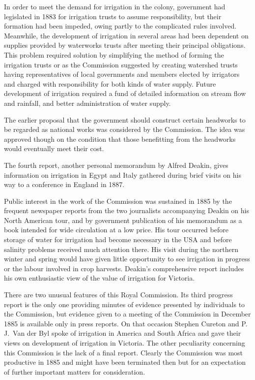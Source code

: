 In order to meet the demand for irrigation in the colony, government
had legislated in 1883 for irrigation trusts to assume responsibility,
but their formation had been impeded, owing partly to the complicated
rules involved.  Meanwhile, the development of irrigation in several
areas had been dependent on supplies provided by waterworks trusts
after meeting their principal obligations.  This problem required
solution by simplifying the method of forming the irrigation trusts
 or as the Commission suggested by creating
watershed trusts  having representatives of
local governments and members elected by irrigators and charged with
responsibility for both kinds of water supply.  Future development of
irrigation required a fund of detailed information on stream flow and
rainfall, and better administration of water supply.

The earlier proposal that the government should construct certain
headworks to be regarded as national works was considered by the
Commission.  The idea was approved though on the condition that those
benefitting from the headworks would eventually meet their cost.

The fourth report, another personal memorandum by Alfred Deakin,
 gives
information on irrigation in Egypt  and Italy
 gathered
during brief visits on his way to a conference in England in
1887.

Public interest in the work of the Commission was sustained in 1885 by
the frequent newspaper reports from the two journalists accompanying
Deakin on his North \index{America}American tour, and by government
publication of his memorandum as a book intended for wide circulation
at a low price.  His tour occurred before storage of water for
irrigation had become necessary in the USA and before
salinity \index{salinity} problems received much attention there.  His
visit during the northern winter and spring would have given little
opportunity to see irrigation in progress or the labour involved in
crop harvests.  Deakin's comprehensive report includes his own
enthusiastic view of the value of irrigation for Victoria.

There are two unusual features of this Royal Commission.  Its third
progress report is the only one providing minutes of evidence
presented by individuals to the Commission, but evidence given to a
meeting of the Commission in December 1885 is available only in press
reports.  On that occasion Stephen Cureton and P.\,J.~Van der Byl
spoke of irrigation in America \index{America} and South Africa
 and gave their views on development of irrigation
in Victoria.  The other peculiarity concerning this Commission is the
lack of a final report.  Clearly the Commission was most productive in
1885 and might have been terminated then but for an expectation of
further important matters for consideration.


